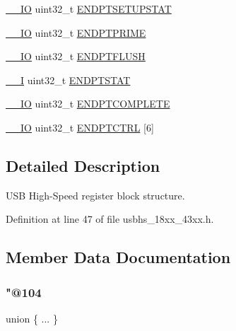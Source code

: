 \begin{DoxyCompactItemize}
\begin{tabbing}
\end{tabbing}\item 
\hyperlink{core__sc300_8h_aec43007d9998a0a0e01faede4133d6be}{\+\_\+\+\_\+\+IO} uint32\+\_\+t \hyperlink{struct_l_p_c___u_s_b_h_s___t_aaa1e9f463c6712b566914be624474756}{E\+N\+D\+P\+T\+S\+E\+T\+U\+P\+S\+T\+AT}
\item 
\hyperlink{core__sc300_8h_aec43007d9998a0a0e01faede4133d6be}{\+\_\+\+\_\+\+IO} uint32\+\_\+t \hyperlink{struct_l_p_c___u_s_b_h_s___t_a0ea21e592743d5a655beea4b4ed72cbf}{E\+N\+D\+P\+T\+P\+R\+I\+ME}
\item 
\hyperlink{core__sc300_8h_aec43007d9998a0a0e01faede4133d6be}{\+\_\+\+\_\+\+IO} uint32\+\_\+t \hyperlink{struct_l_p_c___u_s_b_h_s___t_afe49f090c82c8ec68d34ad42ab384739}{E\+N\+D\+P\+T\+F\+L\+U\+SH}
\item 
\hyperlink{core__sc300_8h_af63697ed9952cc71e1225efe205f6cd3}{\+\_\+\+\_\+I} uint32\+\_\+t \hyperlink{struct_l_p_c___u_s_b_h_s___t_a637b7a6e2aabbb8917eced98ec201732}{E\+N\+D\+P\+T\+S\+T\+AT}
\item 
\hyperlink{core__sc300_8h_aec43007d9998a0a0e01faede4133d6be}{\+\_\+\+\_\+\+IO} uint32\+\_\+t \hyperlink{struct_l_p_c___u_s_b_h_s___t_adda857854c61f65a8cb6da63505bb0ba}{E\+N\+D\+P\+T\+C\+O\+M\+P\+L\+E\+TE}
\item 
\hyperlink{core__sc300_8h_aec43007d9998a0a0e01faede4133d6be}{\+\_\+\+\_\+\+IO} uint32\+\_\+t \hyperlink{struct_l_p_c___u_s_b_h_s___t_aed960a979ffa96c0a1772d3d63cad0b3}{E\+N\+D\+P\+T\+C\+T\+RL} \mbox{[}6\mbox{]}
\end{DoxyCompactItemize}


\subsection{Detailed Description}
U\+SB High-\/\+Speed register block structure. 

Definition at line 47 of file usbhs\+\_\+18xx\+\_\+43xx.\+h.



\subsection{Member Data Documentation}
\mbox{\label{struct_l_p_c___u_s_b_h_s___t_ab8ed6a1c0ec313e06919341fba23f9d1}} 
\subsubsection{\texorpdfstring{"@104}{@104}}
{\footnotesize\ttfamily union \{ ... \} }


